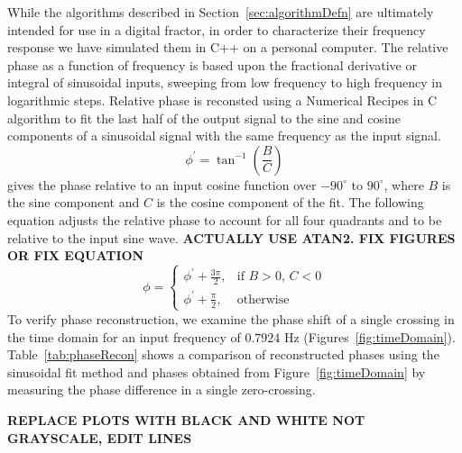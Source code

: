 While the algorithms described in Section~\ref{sec:algorithmDefn} are
ultimately intended for use in a digital fractor, in order to
characterize their frequency response we have simulated them in C++ on a
personal computer. The relative phase as a function of frequency is based upon the
fractional derivative or integral of sinusoidal inputs, sweeping from
low frequency to high frequency in logarithmic steps. Relative phase
is reconsted using a Numerical Recipes in C algorithm to fit the last
half of the output signal to the sine and cosine components of a
sinusoidal signal with the same frequency as the input signal. 
\begin{equation}
\phi^\prime = \tan^{-1}\left(\frac{B}{C}\right)
\label{eqn:initialPhase}
\end{equation}
gives the phase relative to an input cosine function over $-90^\circ$
to $90^\circ$, where $B$ is the sine component and $C$ is the cosine
component of the fit. The following equation adjusts the relative
phase to account for all four quadrants and to be relative to the
input sine wave.
{\bf ACTUALLY USE ATAN2. FIX FIGURES OR FIX EQUATION}
\begin{equation}%
\phi = 
\begin{cases} \phi^\prime+\frac{3\pi}{2}, &\mbox{if } B>0 \mbox{, } C<0\\
\phi^\prime +\frac{\pi}{2}, &\mbox{otherwise}
\end{cases}
\label{eqn:phases}
\end{equation}
To verify phase reconstruction, we examine the phase shift of a single
crossing in the time domain for an input frequency of $0.7924$ Hz
(Figures~\ref{fig:timeDomain}). Table~\ref{tab:phaseRecon}
shows a comparison of reconstructed phases using the sinusoidal fit
method and phases obtained from Figure~\ref{fig:timeDomain} by
measuring the phase difference in a single zero-crossing.

{\bf REPLACE PLOTS WITH BLACK AND WHITE NOT GRAYSCALE, EDIT LINES}

